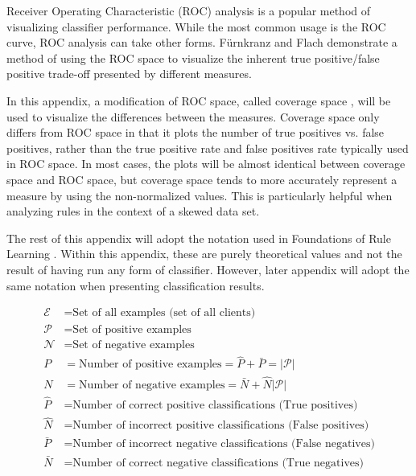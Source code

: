 Receiver Operating Characteristic (ROC) \cite{Fawcett2006AnIT} analysis is a popular method of visualizing classifier performance. While the most common usage is the ROC curve, ROC analysis can take other forms. F{\"u}rnkranz and Flach \cite{furnkranz2005roc} demonstrate a method of using the ROC space to visualize the inherent true positive/false positive trade-off presented by different measures.

In this appendix, a modification of ROC space, called coverage space \cite{furnkranz2005roc}, will be used to visualize the differences between the measures. Coverage space only differs from ROC space in that it plots the number of true positives vs. false positives, rather than the true positive rate and false positives rate typically used in ROC space. 
In most cases, the plots will be almost identical between coverage space and ROC space, but coverage space tends to more accurately represent a measure by using the non-normalized values. This is particularly helpful when analyzing rules in the context of a skewed data set.

The rest of this appendix will adopt the notation used in Foundations of Rule Learning \cite{furnkranz2012foundations}. Within this appendix, these are purely theoretical values and not the result of having run any form of classifier. However, later appendix will adopt the same notation when presenting classification results.


\begin{align*}
	\mathcal{E} &= \text{Set of all examples (set of all clients)} \\
	\mathcal{P} &= \text{Set of positive examples} \\
	\mathcal{N} &= \text{Set of negative examples} \\
	P &= \text{Number of positive examples} = \hat P + \bar P = |\mathcal{P}| \\
	N &= \text{Number of negative examples} = \bar N + \hat N |\mathcal{P}| \\
	\hat P &= \text{Number of correct positive classifications (True positives)} \\
	\hat N &= \text{Number of incorrect positive classifications (False positives)} \\
	\bar P &= \text{Number of incorrect negative classifications (False negatives)} \\
	\bar N &= \text{Number of correct negative classifications (True negatives)} \\
\end{align*}


